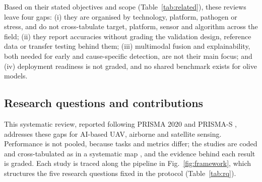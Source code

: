 \documentclass[preprint,12pt]{elsarticle}
\begin{document}
Based on their stated objectives and scope (Table~\ref{tab:related}), these reviews leave four gaps: (i) they are organised by technology, platform, pathogen or stress, and do not cross-tabulate target, platform, sensor and algorithm across the field; (ii) they report accuracies without grading the validation design, reference data or transfer testing behind them; (iii) multimodal fusion and explainability, both needed for early and cause-specific detection, are not their main focus; and (iv) deployment readiness is not graded, and no shared benchmark exists for olive models.
 
\subsection{Research questions and contributions}\label{sec:rq}
 
This systematic review, reported following PRISMA 2020 and PRISMA-S \citep{page2021prisma,rethlefsen2021prismas}, addresses these gaps for AI-based UAV, airborne and satellite sensing. Performance is not pooled, because tasks and metrics differ; the studies are coded and cross-tabulated as in a systematic map \citep{James2016Methodology}, and the evidence behind each result is graded. Each study is traced along the pipeline in Fig.~\ref{fig:framework}, which structures the five research questions fixed in the protocol (Table~\ref{tab:rq}).
 
\end{document}
